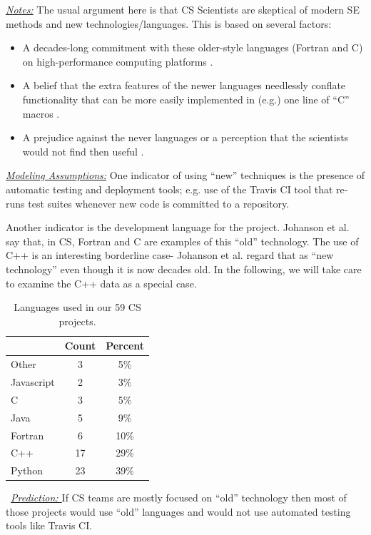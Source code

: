 \documentclass[sigconf,review,anonymous]{acmart}
\begin{document}
\noindent \textit{\underline{Notes:}} The usual argument here is that CS Scientists are skeptical of modern SE methods and new technologies/languages.
This is based on several factors: 
\begin{itemize}
  \item A decades-long commitment with these older-style languages (Fortran and C) on high-performance computing platforms \cite{faulk09_secs}.
  \item A belief that the extra features of the newer languages needlessly conflate functionality that can be more easily implemented in (e.g.) one line of ``C'' macros \cite{sanders08_risk}. 
  \item A prejudice against the never languages or a perception that the scientists would not find then useful \cite{Prabhu11_cssurvey}. 
\end{itemize}



\noindent \textit{\underline{Modeling Assumptions:}} 
One indicator of using ``new'' techniques is the presence of automatic testing and deployment tools; e.g. use of the Travis CI tool that re-runs test suites whenever new code is committed to a repository. 

Another indicator is the development language for the project. 
Johanson et al.~\cite{johan18_secs} say that, in CS, Fortran and C are examples of this ``old'' technology. The use of C++ is an interesting borderline case- Johanson et al. regard that as ``new technology'' even though it is now decades old. In the following, we will take care to examine the C++ data as a special case.




\begin{table}

\caption{Languages used in our 59 CS projects.  
}\label{tbl:language}
 \footnotesize
 \hspace{-3pt}\begin{tabular}{l|c|c}
 \multicolumn{1}{c|}{} & \multicolumn{1}{c|}{Count} & \multicolumn{1}{c}{Percent}\\
\hline
Other & 3 &  5\%  \\ 
Javascript	& 2 & 3\% \\ 
C &	3 & 5\% \\ 
Java	& 5 & 9\% \\ 
Fortran	& 6 & 10\% \\
C++	& 17 & 29\% \\
Python & 23 & 39\% 
\end{tabular}
\end{table} \noindent ~\textit{\underline{Prediction: }} If CS teams are mostly focused on ``old'' technology then most of those projects would use ``old'' languages and would not use automated testing
tools like  Travis CI.
\end{document}
